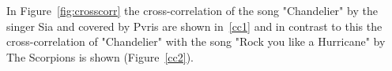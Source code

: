 \noindent In Figure~\ref{fig:crosscorr} the cross-correlation of the song "Chandelier" by the singer Sia and covered by Pvris are shown in~\ref{cc1} and in contrast to this the cross-correlation of "Chandelier" with the song "Rock you like a Hurricane" by The Scorpions is shown (Figure~\ref{cc2}). 
\begin{figure}[htbp]
	\centering
\end{figure}
